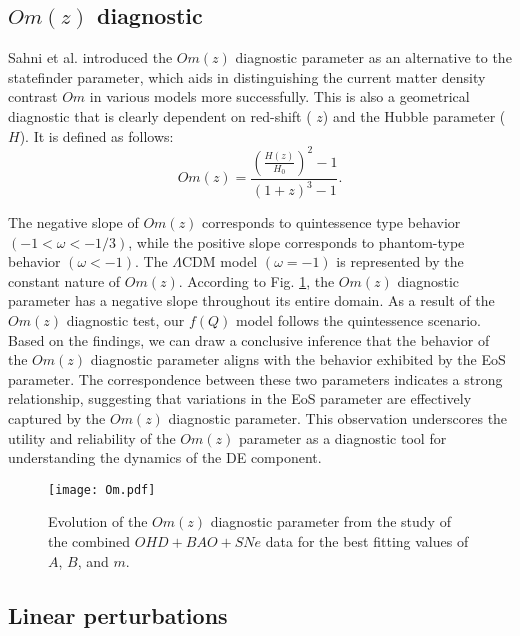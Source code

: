 \documentclass[prd,superscriptaddress,amsfonts,amssymb,amsmath,showpacs,twocolumn]{revtex4-2}
\begin{document}
\subsection{$Om(z)$ diagnostic}

Sahni et al. \cite{Omz} introduced the $Om(z)$ diagnostic parameter as an
alternative to the statefinder parameter, which aids in distinguishing the
current matter density contrast $Om$ in various models more successfully.
This is also a geometrical diagnostic that is clearly dependent on red-shift (%
$z$) and the Hubble parameter ($H$). It is defined as follows: 
\begin{equation}
Om\left( z\right) =\frac{\left( \frac{H\left( z\right) }{H_{0}}\right) ^{2}-1%
}{\left( 1+z\right) ^{3}-1}.
\end{equation}

The negative slope of $Om(z)$ corresponds to quintessence type behavior $%
(-1<\omega< -1/3)$, while the positive slope corresponds to phantom-type
behavior $(\omega<-1)$. The $\Lambda$CDM model $(\omega=-1)$ is represented
by the constant nature of $Om(z)$. According to Fig. \ref{Om}, the $Om(z)$
diagnostic parameter has a negative slope throughout its entire domain. As a
result of the $Om(z)$ diagnostic test, our $f(Q)$ model follows the
quintessence scenario. Based on the findings, we can draw a conclusive inference that the behavior of the $Om(z)$ diagnostic parameter aligns with the behavior exhibited by the EoS parameter. The correspondence between these two parameters indicates a strong relationship, suggesting that variations in the EoS parameter are effectively captured by the $Om(z)$ diagnostic parameter. This observation underscores the utility and reliability of the $Om(z)$ parameter as a diagnostic tool for understanding the dynamics of the DE component.

\begin{figure}[h]
\centerline{\texttt{[image: Om.pdf]}}
\caption{Evolution of the $Om(z)$ diagnostic parameter from the study of the
combined $OHD+BAO+SNe$ data for the best fitting values of $A$, $B$, and $m$.}
\label{Om}
\end{figure}

\subsection{Linear perturbations}
\end{document}
